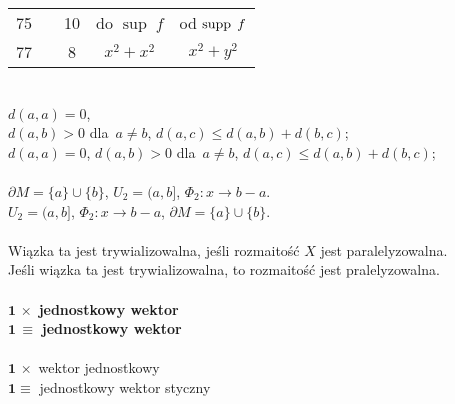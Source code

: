 \documentclass[a4paper,11pt]{article}
\begin{document}
\begin{center}
\begin{tabular}{|c|c|c|c|c|}
    75 & & 10 & do $\sup \; f$ & od $\mathrm{supp}\, \; f$ \\
    77 & & 8 & $x^{ 2 } + x^{ 2 }$ & $x^{ 2 } + y^{ 2 }$ \\
    \hline
  \end{tabular}

\end{center}


\noindent
{} \\
\Jest  $d( a, a ) = 0$, \\[0.1em]
$d( a,b ) > 0$ dla~$a \neq b$, $d( a, c ) \leq d( a, b ) + d( b,c )$; \\[0.3em]
\Powin $d( a, a ) = 0$, $d( a,b ) > 0$ dla~$a \neq b$,
$d( a, c ) \leq d( a, b ) + d( b,c )$; \\[0.3em]
 \\[0.3em]
\Jest  $\partial M = \{ a \} \cup \{ b \}$, $U_{ 2 } = ( a, b ]$,
$\Phi_{ 2 } : x \rightarrow b - a$. \\[0.3em]
\Powin $U_{ 2 } = ( a, b ]$, $\Phi_{ 2 } : x \rightarrow b - a$,
$\partial M = \{ a \} \cup \{ b \}$. \\[0.3em]
 \\
\Jest  Wiązka ta jest trywializowalna, jeśli rozmaitość $X$ jest
paralelyzowalna. \\
\Powin Jeśli wiązka ta jest trywializowalna, to rozmaitość jest
pralelyzowalna. \\
 \\
\Jest  $\mathbf{ 1 } \, \times$ \textbf{jednostkowy wektor} \\
\Powin $\mathbf{ 1 } \, \equiv$ \textbf{jednostkowy wektor} \\
 \\
\Jest  $\mathbf{ 1 } \, \times$ wektor jednostkowy \\
\Powin $\mathbf{ 1 } \equiv$ jednostkowy wektor styczny \\
\end{document}
